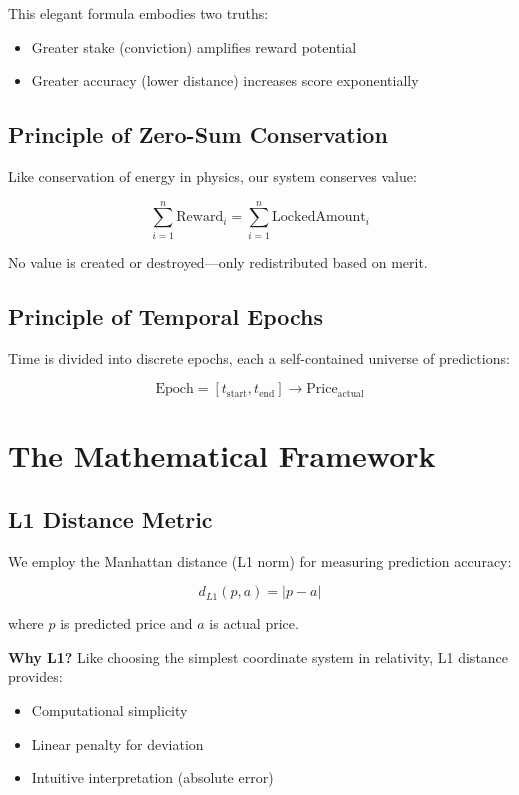 \documentclass[12pt,a4paper]{article}
\begin{document}
This elegant formula embodies two truths:
\begin{itemize}
\item Greater stake (conviction) amplifies reward potential
\item Greater accuracy (lower distance) increases score exponentially
\end{itemize}

\subsection{Principle of Zero-Sum Conservation}
Like conservation of energy in physics, our system conserves value:

\begin{equation}
\sum_{i=1}^{n} \text{Reward}_i = \sum_{i=1}^{n} \text{LockedAmount}_i
\end{equation}

No value is created or destroyed—only redistributed based on merit.

\subsection{Principle of Temporal Epochs}
Time is divided into discrete epochs, each a self-contained universe of predictions:

\begin{equation}
\text{Epoch} = [t_{\text{start}}, t_{\text{end}}] \rightarrow \text{Price}_{\text{actual}}
\end{equation}

\section{The Mathematical Framework}

\subsection{L1 Distance Metric}
We employ the Manhattan distance (L1 norm) for measuring prediction accuracy:

\begin{equation}
d_{L1}(p, a) = |p - a|
\end{equation}

where $p$ is predicted price and $a$ is actual price.

\textbf{Why L1?} Like choosing the simplest coordinate system in relativity, L1 distance provides:
\begin{itemize}
\item Computational simplicity
\item Linear penalty for deviation
\item Intuitive interpretation (absolute error)
\end{itemize}
\end{document}
